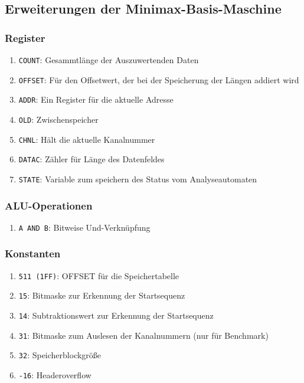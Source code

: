 \documentclass[12pt,titlepage]{article}
\begin{document}
\subsection{Erweiterungen der Minimax-Basis-Maschine}

\subsubsection{Register}

\begin{enumerate}
\item \texttt{COUNT}: Gesammtl{\"a}nge der Auszuwertenden Daten
\item \texttt{OFFSET}: F{\"u}r den Offsetwert, der bei der Speicherung der Längen addiert wird
\item \texttt{ADDR}: Ein Register f{\"u}r die aktuelle Adresse
\item \texttt{OLD}: Zwischenspeicher
\item \texttt{CHNL}: Hält die aktuelle Kanalnummer
\item \texttt{DATAC}: Zähler für Länge des Datenfeldes
\item \texttt{STATE}: Variable zum speichern des Status vom Analyseautomaten
\end{enumerate}

\subsubsection{ALU-Operationen}

\begin{enumerate}
\item \texttt{A AND B}: Bitweise Und-Verknüpfung
\end{enumerate}

\subsubsection{Konstanten}
\begin{enumerate}
\item \texttt{511 (1FF)}: OFFSET für die Speichertabelle
\item \texttt{15}: Bitmaske zur Erkennung der Startsequenz
\item \texttt{14}: Subtraktionswert zur Erkennung der Startsequenz
\item \texttt{31}: Bitmaske zum Auslesen der Kanalnummern (nur für Benchmark)
\item \texttt{32}: Speicherblockgröße
\item \texttt{-16}: Headeroverflow
\end{enumerate}
\end{document}
